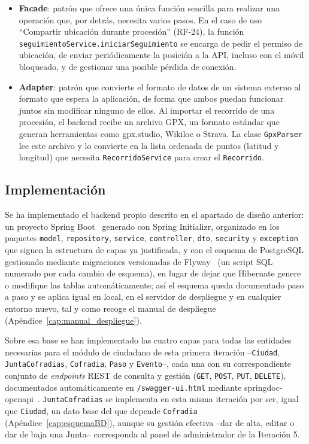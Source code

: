 \begin{itemize}
    \item \textbf{Facade}: patrón que ofrece una única función sencilla para realizar una operación que, por detrás, necesita varios pasos. En el caso de uso ``Compartir ubicación durante procesión'' (RF-24), la función \texttt{seguimientoService.iniciarSeguimiento} se encarga de pedir el permiso de ubicación, de enviar periódicamente la posición a la API, incluso con el móvil bloqueado, y de gestionar una posible pérdida de conexión.
    \item \textbf{Adapter}: patrón que convierte el formato de datos de un sistema externo al formato que espera la aplicación, de forma que ambos puedan funcionar juntos sin modificar ninguno de ellos. Al importar el recorrido de una procesión, el backend recibe un archivo GPX, un formato estándar que generan herramientas como gpx.studio, Wikiloc o Strava. La clase \texttt{GpxParser} lee este archivo y lo convierte en la lista ordenada de puntos (latitud y longitud) que necesita \texttt{RecorridoService} para crear el \texttt{Recorrido}.
\end{itemize}

\subsection{Implementación}

Se ha implementado el backend propio descrito en el apartado de diseño anterior: un proyecto Spring Boot~\cite{springboot} generado con Spring Initializr, organizado en los paquetes \texttt{model}, \texttt{repository}, \texttt{service}, \texttt{controller}, \texttt{dto}, \texttt{security} y \texttt{exception} que siguen la estructura de capas ya justificada, y con el esquema de PostgreSQL gestionado mediante migraciones versionadas de Flyway~\cite{flyway} (un script SQL numerado por cada cambio de esquema), en lugar de dejar que Hibernate genere o modifique las tablas automáticamente; así el esquema queda documentado paso a paso y se aplica igual en local, en el servidor de despliegue y en cualquier entorno nuevo, tal y como recoge el manual de despliegue (Apéndice~\ref{cap:manual_despliegue}).

Sobre esa base se han implementado las cuatro capas para todas las entidades necesarias para el módulo de ciudadano de esta primera iteración --\texttt{Ciudad}, \texttt{JuntaCofradias}, \texttt{Cofradia}, \texttt{Paso} y \texttt{Evento}--, cada una con su correspondiente conjunto de \emph{endpoints} REST de consulta y gestión (\texttt{GET}, \texttt{POST}, \texttt{PUT}, \texttt{DELETE}), documentados automáticamente en \texttt{/swagger-ui.html} mediante springdoc-openapi~\cite{springdoc}. \texttt{JuntaCofradias} se implementa en esta misma iteración por ser, igual que \texttt{Ciudad}, un dato base del que depende \texttt{Cofradia} (Apéndice~\ref{cap:esquemaBD}), aunque su gestión efectiva --dar de alta, editar o dar de baja una Junta-- corresponda al panel de administrador de la Iteración 5.

